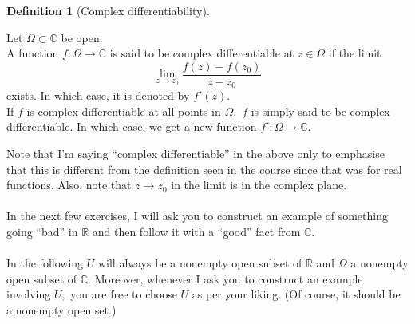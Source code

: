 \documentclass[12pt]{article}
\theoremstyle{definition}
\numberwithin{thm}{section}
\newtheorem{defn}[thm]{Definition}
\newenvironment{blockquote}
{\begin{mdframed}[skipabove=0pt, skipbelow=0pt, innertopmargin=4pt, innerbottommargin=4pt, bottomline=false,topline=false,rightline=false, linewidth=2pt]}
{\end{mdframed}}
\begin{document}
\begin{defn}[Complex differentiability]
\begin{blockquote}
	Let $\Omega \subset \mathbb{C}$ be open.\\
	A function $f:\Omega \to \mathbb{C}$ is said to be complex differentiable at $z \in \Omega$ if the limit
	\begin{equation*} 
		\lim_{z\to z_0}\dfrac{f(z) - f(z_0)}{z - z_0}
	\end{equation*}
	exists. In which case, it is denoted by $f'(z).$ \\
	If $f$ is complex differentiable at all points in $\Omega,$ $f$ is simply said to be complex differentiable. In which case, we get a new function $f':\Omega \to \mathbb{C}.$
\end{blockquote}
\end{defn}
Note that I'm saying ``complex differentiable'' in the above only to emphasise that this is different from the definition seen in the course since that was for real functions. Also, note that $z \to z_0$ in the limit is in the complex plane.\\~\\
%
In the next few exercises, I will ask you to construct an example of something going ``bad'' in $\mathbb{R}$ and then follow it with a ``good'' fact from $\mathbb{C}.$\\~\\
In the following $U$ will always be a nonempty open subset of $\mathbb{R}$ and $\Omega$ a nonempty open subset of $\mathbb{C}.$ Moreover, whenever I ask you to construct an example involving $U,$ you are free to choose $U$ as per your liking. (Of course, it should be a nonempty open set.)
\end{document}
